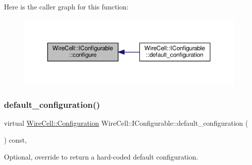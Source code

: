 Here is the caller graph for this function\+:
\nopagebreak
\begin{figure}[H]
\begin{center}
\leavevmode
\includegraphics[width=350pt]{class_wire_cell_1_1_i_configurable_a57ff687923a724093df3de59c6ff237d_icgraph}
\end{center}
\end{figure}
\mbox{\label{class_wire_cell_1_1_i_configurable_a54841b2da3d1ea02189478bff96f7998}} 
\subsubsection{\texorpdfstring{default\+\_\+configuration()}{default\_configuration()}}
{\footnotesize\ttfamily virtual \hyperlink{namespace_wire_cell_a9f705541fc1d46c608b3d32c182333ee}{Wire\+Cell\+::\+Configuration} Wire\+Cell\+::\+I\+Configurable\+::default\+\_\+configuration (\begin{DoxyParamCaption}{ }\end{DoxyParamCaption}) const\hspace{0.3cm}{\ttfamily [inline]}, {\ttfamily [virtual]}}



Optional, override to return a hard-\/coded default configuration. 



